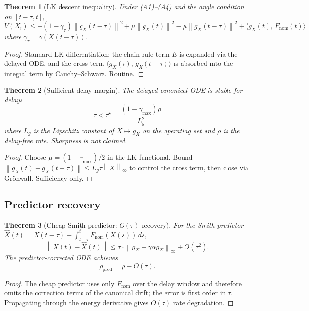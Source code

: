\documentclass[11pt,a4paper]{article}
\newtheorem{theorem}{Theorem}[section]
\theoremstyle{definition}
\newcommand{\norm}[1]{\left\|#1\right\|}
\newcommand{\inner}[2]{\langle #1,\,#2\rangle}
\newcommand{\nom}{\mathrm{nom}}
\begin{document}
\begin{theorem}[LK descent inequality]
\label{thm:md1}
Under (A1)--(A4) and the angle condition on $[t-\tau, t]$,
\[
\dot V(X_t) \leq -(1 - \gamma_\tau)\norm{g_X(t-\tau)}^2 + \mu \norm{g_X(t)}^2 - \mu \norm{g_X(t-\tau)}^2 + \inner{g_X(t)}{F_\nom(t)}
\]
where $\gamma_\tau = \gamma(X(t-\tau))$.
\end{theorem}

\begin{proof}
Standard LK differentiation; the chain-rule term $\dot E$ is expanded via the delayed ODE, and the cross term $\inner{g_X(t)}{g_X(t-\tau)}$ is absorbed into the integral term by Cauchy--Schwarz. Routine.
\end{proof}

\begin{theorem}[Sufficient delay margin]
\label{thm:md2}
The delayed canonical ODE is stable for delays
\[
\tau < \tau^\star = \frac{(1 - \gamma_{\max})\rho}{L_g^2}
\]
where $L_g$ is the Lipschitz constant of $X \mapsto g_X$ on the operating set and $\rho$ is the delay-free rate. Sharpness is not claimed.
\end{theorem}

\begin{proof}
Choose $\mu = (1-\gamma_{\max})/2$ in the LK functional. Bound $\norm{g_X(t) - g_X(t-\tau)} \leq L_g \tau \norm{\dot X}_\infty$ to control the cross term, then close via Grönwall. Sufficiency only.
\end{proof}

\subsection{Predictor recovery}

\begin{theorem}[Cheap Smith predictor: $O(\tau)$ recovery]
\label{thm:md3}
For the Smith predictor $\hat X(t) = X(t-\tau) + \int_{t-\tau}^t F_\nom(X(s))\,ds$,
\[
\norm{X(t) - \hat X(t)} \leq \tau\cdot \norm{g_X + \gamma\alpha g_X}_\infty + O(\tau^2).
\]
The predictor-corrected ODE achieves
\[
\rho_{\mathrm{pred}} = \rho - O(\tau).
\]
\end{theorem}

\begin{proof}
The cheap predictor uses only $F_\nom$ over the delay window and therefore omits the correction terms of the canonical drift; the error is first order in $\tau$. Propagating through the energy derivative gives $O(\tau)$ rate degradation.
\end{proof}
\end{document}
